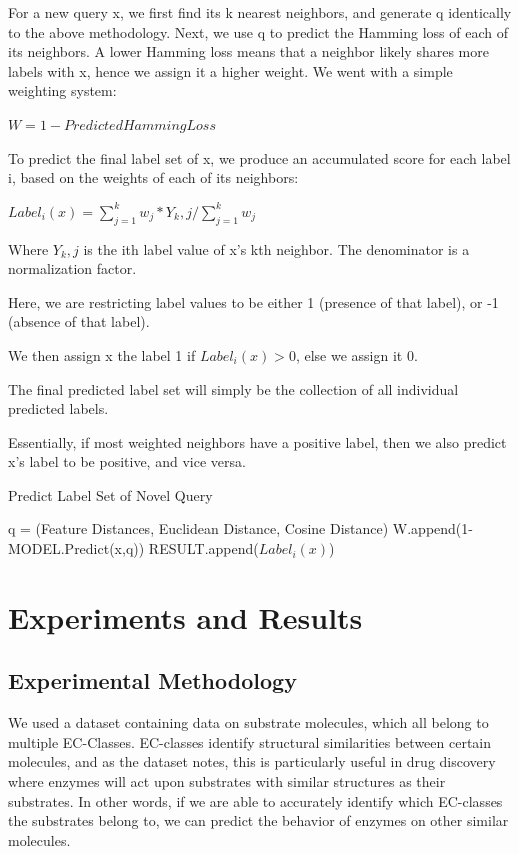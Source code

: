 \documentclass{article}
\begin{document}
For a new query x, we first find its k nearest neighbors, and generate q identically to the above methodology. Next, we use q to predict the Hamming loss of each of its neighbors. A lower Hamming loss means that a neighbor likely shares more labels with x, hence we assign it a higher weight. We went with a simple weighting system: 

$W = 1 - PredictedHammingLoss$

To predict the final label set of x, we produce an accumulated score for each label i, based on the weights of each of its neighbors:

$Label_i(x) = \sum_{j=1}^{k} w_j * Y_k,j / \sum_{j=1}^{k} w_j$ 

Where $Y_k,j$ is the ith label value of x's kth neighbor. The denominator is a normalization factor.

Here, we are restricting label values to be either 1 (presence of that label), or -1 (absence of that label).

We then assign x the label 1 if $Label_i(x) > 0$, else we assign it 0.

The final predicted label set will simply be the collection of all individual predicted labels.

Essentially, if most weighted neighbors have a positive label, then we also predict x's label to be positive, and vice versa\cite{chiang}.

\begin{algorithm}
   \caption{Predict Label Set of Novel Query}
   \label{alg:example}
\begin{algorithmic}

   \STATE q = (Feature Distances, Euclidean Distance, Cosine Distance)
   \STATE W.append(1-MODEL.Predict(x,q))
   \ENDFOR
    \STATE RESULT.append($Label_i(x)$)
    \ENDFOR
\end{algorithmic}
\end{algorithm}

\section{Experiments and Results}
\label{results}

\subsection{Experimental Methodology}

We used a dataset containing data on substrate molecules, which all belong to multiple EC-Classes. EC-classes identify structural similarities between certain molecules, and as the dataset notes, this is particularly useful in drug discovery where enzymes will act upon substrates with similar structures as their substrates. In other words, if we are able to accurately identify which EC-classes the substrates belong to, we can predict the behavior of enzymes on other similar molecules.
\end{document}
